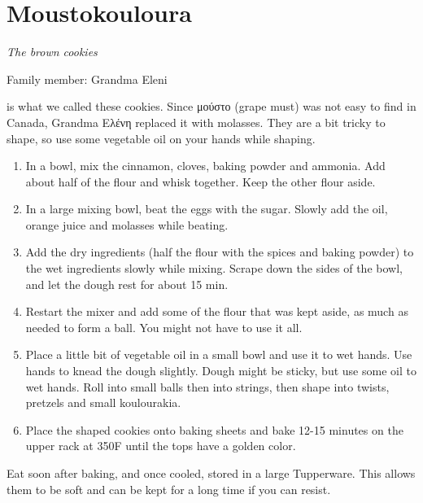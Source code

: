 \chapter{Moustokouloura}
\label{ch:moustokouloura}


\textit{The brown cookies}

Family member: Grandma Eleni

 is what we called these cookies. Since \textgreek{μούστο} (grape must) was not easy to find in Canada, Grandma \textgreek{Ελένη} replaced it with molasses. They are a bit tricky to shape, so use some vegetable oil on your hands while shaping.

\begin{enumerate}
    \item In a bowl, mix the cinnamon, cloves, baking powder and ammonia. Add about half of the flour and whisk together. Keep the other flour aside.
    \item In a large mixing bowl, beat the eggs with the sugar. Slowly add the oil, orange juice and molasses while beating.
    \item Add the dry ingredients (half the flour with the spices and baking powder) to the wet ingredients slowly while mixing. Scrape down the sides of the bowl, and let the dough rest for about 15 min.
    \item Restart the mixer and add some of the flour that was kept aside, as much as needed to form a ball. You might not have to use it all.
    \item Place a little bit of vegetable oil in a small bowl and use it to wet hands. Use hands to knead the dough slightly. Dough might be sticky, but use some oil to wet hands. Roll into small balls then into strings, then shape into twists, pretzels and small koulourakia.
    \item Place the shaped cookies onto baking sheets and bake 12-15 minutes on the upper rack at 350\degree F until the tops have a golden color.
\end{enumerate}

Eat soon after baking, and once cooled, stored in a large Tupperware. This allows them to be soft and can be kept for a long time if you can resist.

